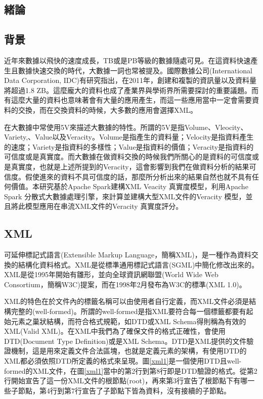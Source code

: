 \begin{center}
\section{緒論}
\end{center}

\subsection{背景}
近年來數據以飛快的速度成長，TB或是PB等級的數據隨處可見。在這資料快速產生且數據快速交換的時代，大數據一詞也常被提及。國際數據公司(International Data Corporation, IDC)有研究指出\cite{gantz2011extracting}，在2011年，創建和複製的資訊量以及資料量將超過1.8 ZB。這麼龐大的資料也成了產業界與學術界所需要探討的重要議題。而有這麼大量的資料也意味著會有大量的應用產生，而這一些應用當中一定會需要資料的交換，而在交換資料的時候，大多數的應用會選擇XML。\\\par
在大數據中常使用5V\cite{ibm5v}\cite{khan2014big}來描述大數據的特性。所謂的5V是指Volume、Vleocity、Variety,、Value以及Veracity。Volume是指產生的資料量；Velocity是指資料產生的速度；Variety是指資料的多樣性；Value是指資料的價值；Veracity\cite{veracityimpor}是指資料的可信度或是真實度。而大數據在做資料交換的時候我們所關心的是資料的可信度或是真實度，也就是上述所提到的Veracity，這會影響到我們在做資料分析的結果可信度。假使進來的資料不具可信度的話，那麼所分析出來的結果自然也就不具有任何價值。本研究基於Apache Spark建構XML Veacity 真實度模型，利用Apache Spark 分散式大數據處理引擎，來計算並建構大型XML文件的Veracity 模型，並且將此模型應用在串流XML文件的Veracity 真實度評分。

\subsection{XML}
可延伸標記式語言(Extensible Markup Language，簡稱XML)\cite{rfc7303}，是一種作為資料交換的結構化資料格式。XML是從標準通用標記式語言(SGML)中簡化修改出來的。XML是從1995年開始有雛形，並向全球資訊網聯盟(World Wide Web Consortium，簡稱W3C)提案，而在1998年2月發布為W3C的標準(XML 1.0)。\\\par
XML的特色在於文件內的標籤名稱可以由使用者自行定義，而XML文件必須是結構完整的(well-formed)。所謂的well-formed是指XML要符合每一個標籤都要有起始元素之巢狀結構，而符合格式規範，如DTD或XML Schema得則稱為有效的XML(Valid XML)。在XML中我們為了確保文件的格式正確性，會使用DTD(Document Type Definition)\cite{dtd}或是XML Schema\cite{xsd}。DTD是XML提供的文件驗證機制，這是用來定義文件合法區塊，也就是定義元素的架構，有使用DTD的XML都必須依照DTD所定義的格式來呈現。圖\ref{xml1}是一個使用DTD且well-formed的XML文件，在圖\ref{xml1}當中的第2行到第8行即是DTD驗證的格式。從第2行開始宣告了這一份XML文件的根節點(root)，再來第3行宣告了根節點下有哪一些子節點，第4行到第7行宣告了子節點下皆為資料，沒有接續的子節點。

